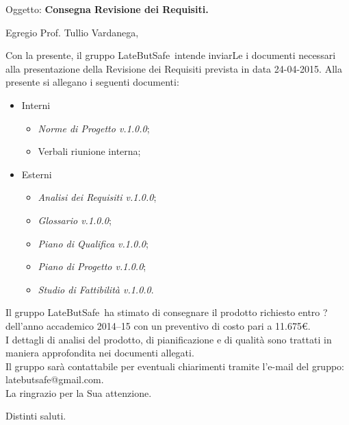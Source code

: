 \documentclass{letter}
\makeatletter
\newcommand{\AnalisiDeiRequisiti}{\textit{Analisi dei Requisiti v.1.0.0}}
\newcommand{\PianoDiProgetto}{\textit{Piano di Progetto v.1.0.0}}
\newcommand{\NormeDiProgetto}{\textit{Norme di Progetto v.1.0.0}}
\newcommand{\PianoDiQualifica}{\textit{Piano di Qualifica v.1.0.0}}
\newcommand{\Glossario}{\textit{Glossario v.1.0.0}}
\newcommand{\StudioDiFattibilita}{\textit{Studio di Fattibilità v.1.0.0}}
\newcommand{\gruppo}{LateButSafe}
\newcommand{\mail}{latebutsafe@gmail.com}
\newcommand{\Vardanega}{Prof. Tullio Vardanega}
\makeatother
\begin{document}
	
	\begin{letter}{Oggetto: \textbf{Consegna Revisione dei Requisiti.}}
	\opening {Egregio \Vardanega ,}
	Con la presente, il gruppo \gruppo\ intende inviarLe i documenti necessari alla presentazione della Revisione dei Requisiti prevista in data 24-04-2015.
	Alla presente si allegano i seguenti documenti:
			\begin{itemize}
				\item Interni
					\begin{itemize}
						\item \NormeDiProgetto;
						\item Verbali riunione interna;						
					\end{itemize}
				\item Esterni
					\begin{itemize}
						\item \AnalisiDeiRequisiti;
						\item \Glossario;
						\item \PianoDiQualifica;
						\item \PianoDiProgetto;
						\item \StudioDiFattibilita.
					\end{itemize}
			\end{itemize} 
		Il gruppo \gruppo\ ha stimato di consegnare il prodotto richiesto entro ? dell’anno accademico 2014–15 con un preventivo di costo pari a 11.675\euro. \\
		I dettagli di analisi del prodotto, di pianificazione e di qualità sono trattati in maniera	approfondita nei documenti allegati.	\\
		Il gruppo sarà  contattabile per eventuali chiarimenti tramite l'e-mail del gruppo: \mail.	\\
		La ringrazio per la Sua attenzione.
		
		\thispagestyle{fancy}
		\closing{Distinti saluti.}

   \end{letter}
\end{document}
